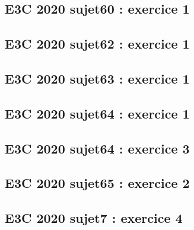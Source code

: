 \documentclass[lang=fr,edition=teacher,layout=sheet]{mxbook}
\begin{document}
\begingroup\endgroup
\par\bigskip
{}\subsection*{E3C 2020 sujet60 : exercice 1}
\begingroup\endgroup
\par\bigskip
{}\subsection*{E3C 2020 sujet62 : exercice 1}
\begingroup\endgroup
\par\bigskip
{}\subsection*{E3C 2020 sujet63 : exercice 1}
\begingroup\endgroup
\par\bigskip
{}\subsection*{E3C 2020 sujet64 : exercice 1}
\begingroup\endgroup
\par\bigskip
{}\subsection*{E3C 2020 sujet64 : exercice 3}
\begingroup\endgroup
\par\bigskip
{}\subsection*{E3C 2020 sujet65 : exercice 2}
\begingroup\endgroup
\par\bigskip
{}\subsection*{E3C 2020 sujet7 : exercice 4}
\begingroup\endgroup
\end{document}
